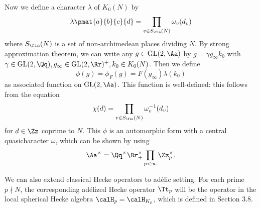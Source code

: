 Now we define a character $\lambda$ of $K_{0}(N)$ by 
$$
\lambda\pmat{a}{b}{c}{d} = \prod_{v\in S_{\fin}(N)} \omega_{v}(d_{v})
$$
where $S_{\fin}(N)$ is a set of non-archimedean places dividing $N$. By strong approximation theorem, we can write any $g\in \GL(2, \Aa)$ by $g = \gamma g_{\infty} k_0$ with $\gamma \in \GL(2, \Qq), g_{\infty} \in \GL(2, \Rr)^{+}, k_{0}\in K_{0}(N)$. 
Then we define 
$$
\phi(g) = \phi_{F}(g) = F(g_{\infty}) \lambda(k_{0})
$$
as associated function on $\GL(2, \Aa)$. This function is well-defined: this follows from the equation
$$
\chi(d) = \prod_{v\in S_{\fin}(N)} \omega_{v}^{-1}(d_{v})
$$
for $d\in \Zz$ coprime to $N$. This $\phi$ is an automorphic form with a central quasicharacter $\omega$, which can be shown by using 
$$
\Aa^{\times}= \Qq^{\times} \Rr_{+}^{\times} \prod_{p<\infty} \Zz_{p}^{\times}. 
$$

We can also extend classical Hecke operators to ad\'elic setting. For each prime $p\nmid N$, the corresponding ad\'elized Hecke operator $\Tt_{p}$ will be the operator in the local spherical Hecke algebra $\calH_{p}=\calH_{K_p}$, which is defined in Section 3.8. 
 

